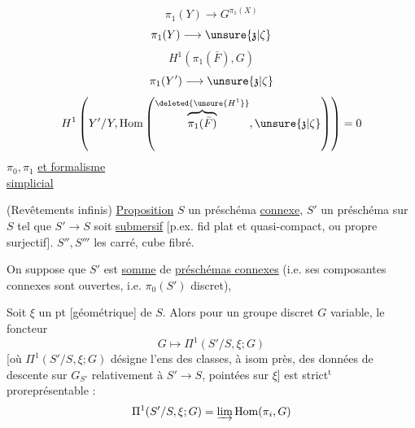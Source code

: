 \[
\pi_1(Y)\longrightarrow G^{\pi_1(X)}
\]
\[
\pi_1(Y)\longrightarrow\unsure{\mathfrak z|\zeta}
\]
\[
H^1(\pi_1(\bar F),G)
\]
\[
\pi_1(Y')\longrightarrow\unsure{\mathfrak z|\zeta}
\]
\[
H^1\left(Y'/Y,\operatorname{Hom}
\left(\overset{\deleted{\unsure{H^1}}}{\overbrace{\pi_1(\bar F)}},\unsure{\mathfrak z|\zeta}\right)\right)=0
\]
$\pi_0,\pi_1$ \uline{et formalisme}\\
\uline{simplicial}

(Revêtements infinis)
\uline{Proposition} $S$ un préschéma \uline{connexe},
$S'$ un préschéma sur $S$ tel que $S'\to S$ soit \uline{submersif}
[p.ex. fid plat et quasi-compact, ou propre surjectif].
$S'',S'''$ les carré, cube fibré.

On suppose que $S'$ est \uline{somme} de \uline{préschémas connexes}
(i.e. ses composantes connexes sont ouvertes, i.e. $\pi_0(S')$ discret),

Soit $\xi$ un pt [géométrique] de $S$. Alors pour un groupe discret $G$ variable, le foncteur
\[
G\longmapsto\Pi^1(S'/S,\xi;G)
\]
 [où $\Pi^1(S'/S,\xi;G)$ désigne l'ens des classes, à isom près, des données de descente sur $G_{S'}$  relativement à $S'\to S$, pointées sur $\xi$] est strict$^{\mathrm t}$ proreprésentable :
\[
\Pi^1(S'/S,\xi;G)=\varinjlim\operatorname{Hom}(\pi_i,G)
\]

